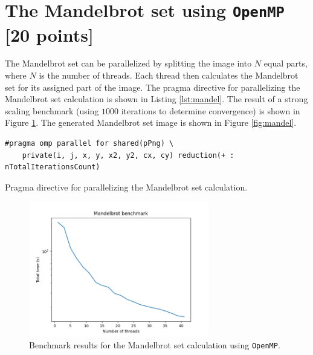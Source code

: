 \documentclass[unicode,11pt,a4paper,oneside,numbers=endperiod,openany]{scrartcl}
\begin{document}
\section{The Mandelbrot set  using \texttt{OpenMP} [20 points]}

The Mandelbrot set can be parallelized by splitting the image into $N$ equal parts, where $N$ is the number of threads. Each thread then calculates the Mandelbrot set for its assigned part of the image. The pragma directive for parallelizing the Mandelbrot set calculation is shown in Listing \ref{lst:mandel}. The result of a strong scaling benchmark (using $1000$ iterations to determine convergence) is shown in Figure \ref{fig:mandel_benchmark}. The generated Mandelbrot set image is shown in Figure \ref{fig:mandel}.

\begin{listing}[h!t]
    \begin{verbatim}
#pragma omp parallel for shared(pPng) \ 
    private(i, j, x, y, x2, y2, cx, cy) reduction(+ : nTotalIterationsCount)
    \end{verbatim}
    \caption{Pragma directive for parallelizing the Mandelbrot set calculation.}
    \label{lst:mandel}
\end{listing}

\begin{figure}[h]
    \centering
    \includegraphics[width=0.7\textwidth]{../code/mandel/benchmark.png}
    \caption{Benchmark results for the Mandelbrot set calculation using \texttt{OpenMP}.}
    \label{fig:mandel_benchmark}
\end{figure}
\end{document}
